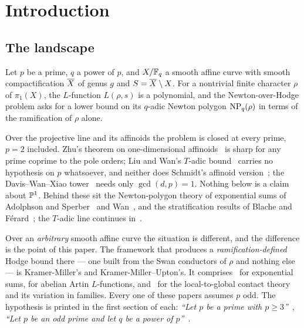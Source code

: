 
\section{Introduction}
\label{sec:intro}

\subsection{The landscape}
\label{sec:landscape}

Let $p$ be a prime, $q$ a power of $p$, and $X/\mathbb{F}_q$ a smooth affine curve
with smooth compactification $\overline{X}$ of genus $g$ and $S = \overline{X}
\setminus X$. For a nontrivial finite character $\rho$ of $\pi_1(X)$, the
$L$-function $L(\rho,s)$ is a polynomial, and the Newton-over-Hodge problem
asks for a lower bound on its $q$-adic Newton polygon $\operatorname{NP}_q(\rho)$ in terms
of the ramification of $\rho$ alone.

Over the projective line and its affinoids the problem is closed at every
prime, $p = 2$ included. Zhu's theorem on one-dimensional
affinoids~\cite{zhu2004newton} is sharp for any prime coprime to the pole
orders; Liu and Wan's $T$-adic bound~\cite[Theorem~5.2]{liuwan2009tadic}
carries no hypothesis on $p$ whatsoever, and neither does Schmidt's
affinoid version~\cite{schmidt2023tadic}; the Davis--Wan--Xiao
tower~\cite{daviswanxiao2016newton} needs only $\gcd(d,p) = 1$. Nothing
below is a claim about $\mathbb{P}^1$. Behind these sit the Newton-polygon theory
of exponential sums of Adolphson and Sperber~\cite{adolphsonsperber1989exponential,adolphsonsperber1993twisted}
and Wan~\cite{wan1993newton,wan2004variation}, and the stratification
results of Blache and F\'erard~\cite{blacheferard2007newton}; the $T$-adic
line continues in~\cite{haessig2026}.

Over an \emph{arbitrary} smooth affine curve the situation is different,
and the difference is the point of this paper. The framework that produces
a \emph{ramification-defined} Hodge bound there --- one built from the Swan
conductors of $\rho$ and nothing else --- is Kramer-Miller's and
Kramer-Miller--Upton's. It comprises~\cite{kramermiller2021padic} for exponential sums,
\cite{kramermiller2020abelian} for abelian Artin $L$-functions, and~\cite{kramermillerupton2021newton,kramermillerupton2021variation} for the local-to-global
contact theory and its variation in families. Every one of these papers
assumes $p$ odd. The hypothesis is printed in the first section of each:
\emph{``Let $p$ be a prime with $p \ge 3$''}~\cite{kramermiller2020abelian}, \emph{``Let $p$ be an odd prime and let $q$
be a power of $p$''}~\cite{kramermillerupton2021newton}.

